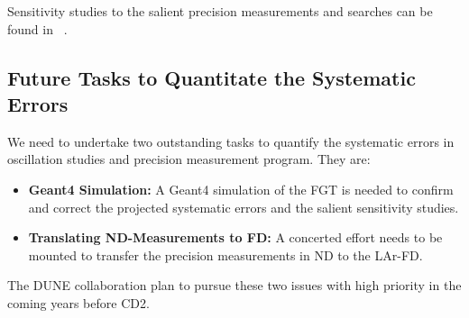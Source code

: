 Sensitivity studies to the salient precision measurements and searches can be found in 
~\cite{Adams:2013qkq, DPR}. 


\subsection{Future Tasks to Quantitate the Systematic Errors}
\label{cdrsec:detectors-nd-ref-fgt-req-future} 

We need to undertake two outstanding tasks to quantify the systematic errors in oscillation studies 
and precision measurement program. They are: 

\begin{itemize}
    \item {\bf Geant4 Simulation:} A Geant4 simulation of the FGT is needed to confirm and correct 
    the projected systematic errors and  the salient sensitivity studies. 
    
     \item {\bf Translating ND-Measurements to FD:} A concerted effort needs to be mounted to transfer 
     the precision measurements in ND to the LAr-FD. 
     
\end{itemize}    

The DUNE collaboration plan to pursue these two issues with high priority in the coming years before CD2. 
